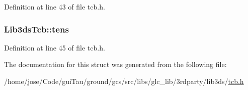 Definition at line 43 of file tcb.\-h.

\hypertarget{struct_lib3ds_tcb_af968af82a719cb2d6bb744b536c4e332}{
\subsubsection[{tens}]{ Lib3ds\-Tcb\-::tens}}\label{struct_lib3ds_tcb_af968af82a719cb2d6bb744b536c4e332}


Definition at line 45 of file tcb.\-h.



The documentation for this struct was generated from the following file\-:\begin{DoxyCompactItemize}
\item 
/home/jose/\-Code/gui\-Tau/ground/gcs/src/libs/glc\-\_\-lib/3rdparty/lib3ds/\hyperlink{tcb_8h}{tcb.\-h}\end{DoxyCompactItemize}
